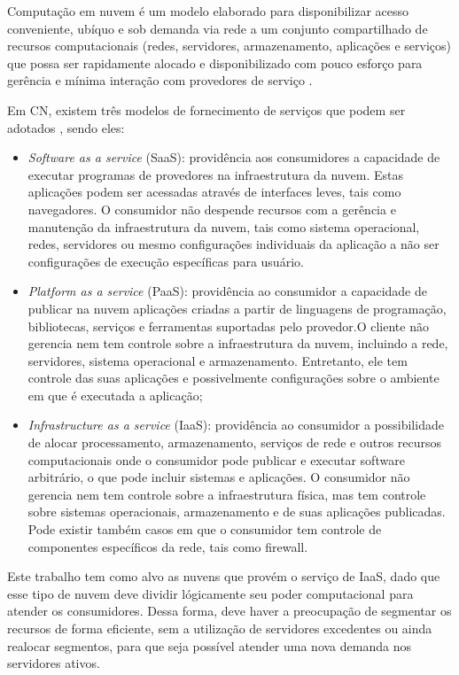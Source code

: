 Computação em nuvem é um modelo elaborado para disponibilizar acesso conveniente, ubíquo e sob demanda via rede a um conjunto compartilhado de recursos computacionais (redes, servidores, armazenamento, aplicações e serviços) que possa ser rapidamente alocado e disponibilizado com pouco esforço para gerência e mínima interação com provedores de serviço \cite{mell2011nist}.

Em CN, existem três modelos de fornecimento de serviços que podem ser adotados \cite{mell2011nist}, sendo eles:

\begin{itemize}
	\item \textit{Software as a service} (SaaS): providência aos consumidores a capacidade de executar programas de provedores na infraestrutura da nuvem. Estas aplicações podem ser acessadas através de interfaces leves, tais como navegadores. O consumidor não despende recursos com a gerência e manutenção da infraestrutura da nuvem, tais como sistema operacional, redes, servidores ou mesmo configurações individuais da aplicação a não ser configurações de execução específicas para usuário.
	
	\item \textit{Platform as a service} (PaaS): providência ao consumidor a capacidade de publicar na nuvem aplicações criadas a partir de linguagens de programação, bibliotecas, serviços e ferramentas suportadas pelo provedor.O cliente não gerencia nem tem controle sobre a infraestrutura da nuvem, incluindo a rede, servidores, sistema operacional e armazenamento. Entretanto, ele tem controle das suas aplicações e possivelmente configurações sobre o ambiente em que é executada a aplicação;

	\item \textit{Infrastructure as a service} (IaaS): providência ao consumidor a possibilidade de alocar processamento, armazenamento, serviços de rede e outros recursos computacionais onde o consumidor pode publicar e executar software arbitrário, o que pode incluir sistemas e aplicações. O consumidor não gerencia nem tem controle sobre a infraestrutura física, mas tem controle sobre sistemas operacionais, armazenamento e de suas aplicações publicadas. Pode existir também casos em que o consumidor tem controle de componentes específicos da rede, tais como firewall.
\end{itemize}

Este trabalho tem como alvo as nuvens que provém o serviço de IaaS, dado que esse tipo de nuvem deve dividir lógicamente seu poder computacional para atender os consumidores. Dessa forma, deve haver a preocupação de segmentar os recursos de forma eficiente, sem a utilização de servidores excedentes ou ainda realocar segmentos, para que seja possível atender uma nova demanda nos servidores ativos.
